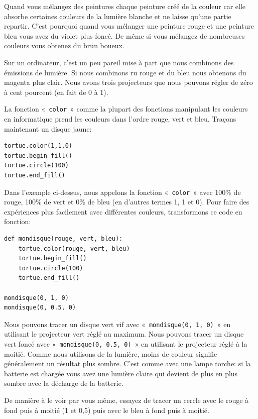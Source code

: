 Quand vous mélangez des peintures chaque peinture créé de la couleur car elle absorbe certaines couleurs de la lumière blanche et ne laisse qu'une partie repartir. C'est pourquoi quand vous mélanger une peinture rouge et une peinture bleu vous avez du violet plus foncé. De même si vous mélangez de nombreuses couleurs vous obtenez du brun boueux.
 
Sur un ordinateur, c'est un peu pareil mise à part que nous combinons des émissions de lumière. Si nous combinons ru rouge et du bleu nous obtenons du magenta plus clair.
Nous avons trois projecteurs que nous pouvons régler de zéro à cent pourcent (en fait de 0 à 1).

La fonction «~\texttt{color}~» comme la plupart des fonctions manipulant les couleurs en informatique prend les couleurs dans l'ordre rouge, vert et bleu. Traçons maintenant un disque jaune:

\begin{Verbatim}[frame=single,rulecolor=\color{mbleu}, label=à taper]
tortue.color(1,1,0)
tortue.begin_fill()
tortue.circle(100)
tortue.end_fill()
\end{Verbatim}

Dans l'exemple ci-dessus, nous appelons la fonction «~\texttt{color}~» avec 100\% de rouge, 100\% de vert et 0\% de bleu (en d'autres termes 1, 1 et 0). Pour faire des expériences plus facilement avec différentes couleurs, transformons ce code en fonction:
\begin{Verbatim}[frame=single,rulecolor=\color{mbleu}, label=à taper]
def mondisque(rouge, vert, bleu):
    tortue.color(rouge, vert, bleu)
    tortue.begin_fill()
    tortue.circle(100)
    tortue.end_fill()
    
mondisque(0, 1, 0)
mondisque(0, 0.5, 0)
\end{Verbatim}

Nous pouvons tracer un disque vert vif avec «~\texttt{mondisque(0, 1, 0)}~»  en utilisant le projecteur vert réglé au maximum. Nous pouvons tracer un disque vert foncé avec «~\texttt{mondisque(0, 0.5, 0)}~» en utilisant le projecteur réglé à la moitié. Comme nous utilisons de la lumière, moins de couleur signifie généralement un résultat plus sombre. C'est comme avec une lampe torche: si la batterie est chargée vous avez une lumière claire qui devient de plus en plus sombre avec la décharge de la batterie.

De manière à le voir par vous même, essayez de tracer un cercle avec le rouge à fond puis à moitié (1 et 0,5) puis avec le bleu à fond puis à moitié.

